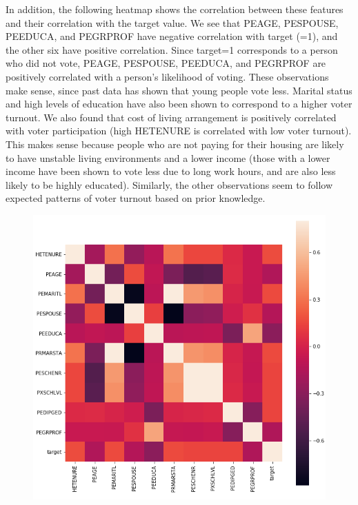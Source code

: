 \noindent
In addition, the following heatmap shows the correlation between these features and their correlation with the target value. We see that PEAGE, PESPOUSE, PEEDUCA, and PEGRPROF have negative correlation with target (=1), and the other six have positive correlation. Since target=1 corresponds to a person who did not vote, PEAGE, PESPOUSE, PEEDUCA, and PEGRPROF are positively correlated with a person’s likelihood of voting. These observations make sense, since past data has shown that young people vote less. Marital status and high levels of education have also been shown to correspond to a higher voter turnout. We also found that cost of living arrangement is positively correlated with voter participation (high HETENURE is correlated with low voter turnout). This makes sense because people who are not paying for their housing are likely to have unstable living environments and a lower income (those with a lower income have been shown to vote less due to long work hours, and are also less likely to be highly educated). Similarly, the other observations seem to follow expected patterns of voter turnout based on prior knowledge.

\vspace{-2ex}

\begin{figure}[hbt!]
\center
\includegraphics[scale=0.3]{final.png}
\end{figure}

